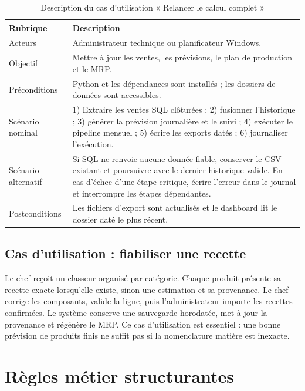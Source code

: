\begin{table}[H]
\centering
\caption{Description du cas d'utilisation « Relancer le calcul complet »}
\label{tab:uc-relancer}
\begin{tabularx}{\textwidth}{p{3.7cm}Y}
\toprule
\textbf{Rubrique} & \textbf{Description} \\
\midrule
Acteurs & Administrateur technique ou planificateur Windows. \\
Objectif & Mettre à jour les ventes, les prévisions, le plan de production et le MRP. \\
Préconditions & Python et les dépendances sont installés ; les dossiers de données sont accessibles. \\
Scénario nominal & 1) Extraire les ventes SQL clôturées ; 2) fusionner l'historique ; 3) générer la prévision journalière et le suivi ; 4) exécuter le pipeline mensuel ; 5) écrire les exports datés ; 6) journaliser l'exécution. \\
Scénario alternatif & Si SQL ne renvoie aucune donnée fiable, conserver le CSV existant et poursuivre avec le dernier historique valide. En cas d'échec d'une étape critique, écrire l'erreur dans le journal et interrompre les étapes dépendantes. \\
Postconditions & Les fichiers d'export sont actualisés et le dashboard lit le dossier daté le plus récent. \\
\bottomrule
\end{tabularx}
\end{table}

\subsection{Cas d'utilisation : fiabiliser une recette}

Le chef reçoit un classeur organisé par catégorie. Chaque produit présente sa
recette exacte lorsqu'elle existe, sinon une estimation et sa provenance. Le chef
corrige les composants, valide la ligne, puis l'administrateur importe les
recettes confirmées. Le système conserve une sauvegarde horodatée, met à jour la
provenance et régénère le MRP. Ce cas d'utilisation est essentiel : une bonne
prévision de produits finis ne suffit pas si la nomenclature matière est
inexacte.

\section{Règles métier structurantes}

